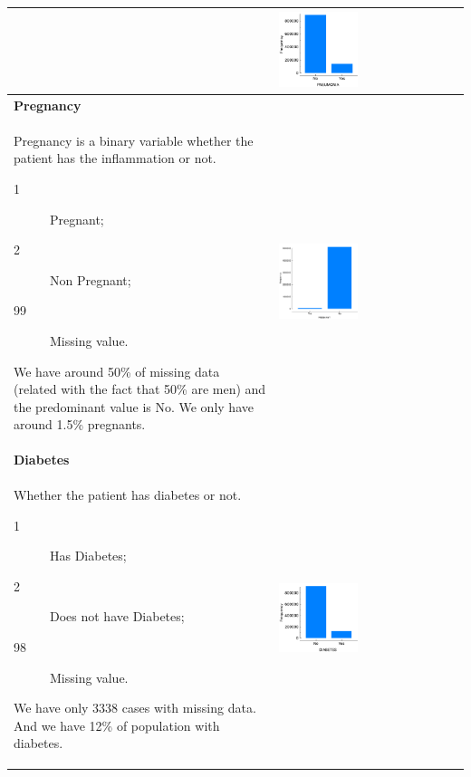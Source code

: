 \begin{longtable}{P{0.45\textwidth}P{0.45\textwidth}}
& \includegraphics[width=0.44\textwidth]{img/appendix/feature_pneumonia.png} 
\\ \hline
\textbf{Pregnancy} & \\
Pregnancy is a binary variable whether the patient has the inflammation or not.
\begin{description}
    \item[1] Pregnant;
    \item[2] Non Pregnant;
    \item[99] Missing value.
\end{description}
We have around 50\% of missing data (related with the fact
that 50\% are men) and the predominant value is No.
We only have around 1.5\% pregnants.
& \includegraphics[width=0.44\textwidth]{img/appendix/feature_pregnant.png} 
\\ \hline
\textbf{Diabetes} & \\
Whether the patient has diabetes or not.
\begin{description}
    \item[1] Has Diabetes;
    \item[2] Does not have Diabetes;
    \item[98] Missing value.
\end{description}
We have only 3338 cases with missing data.
And we have 12\% of population with diabetes.
& \includegraphics[width=0.44\textwidth]{img/appendix/feature_diabetes.png} 

\end{longtable}
